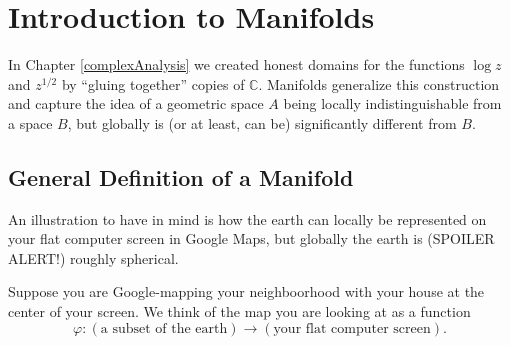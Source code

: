 \documentclass[12pt]{book}%
\theoremstyle{plain}
\theoremstyle{definition}
\theoremstyle{remark}
\def\to{\rightarrow}
\def\bC{{\mathbb{C}}}
\begin{document}
\chapter{Introduction to Manifolds}
\label{manifolds}

In Chapter \ref{complexAnalysis} we created honest domains for the functions $\log z$ and $z^{1/2}$ by ``gluing together'' copies of $\bC$. Manifolds generalize this construction and capture the idea of a geometric space $A$ being locally indistinguishable from a space $B$, but globally is (or at least, can be) significantly different from $B$.




\section{General Definition of a Manifold}

An illustration to have in mind is how the earth can locally be represented on your flat computer screen in
Google Maps, but globally the earth is (SPOILER ALERT!) roughly spherical.



Suppose you are Google-mapping your neighboorhood with your house at the center of your screen.
We think of the map you are looking at as a function
$$
  \varphi:(\text{a subset of the earth}) \to (\text{your flat computer screen}).
$$
\end{document}
